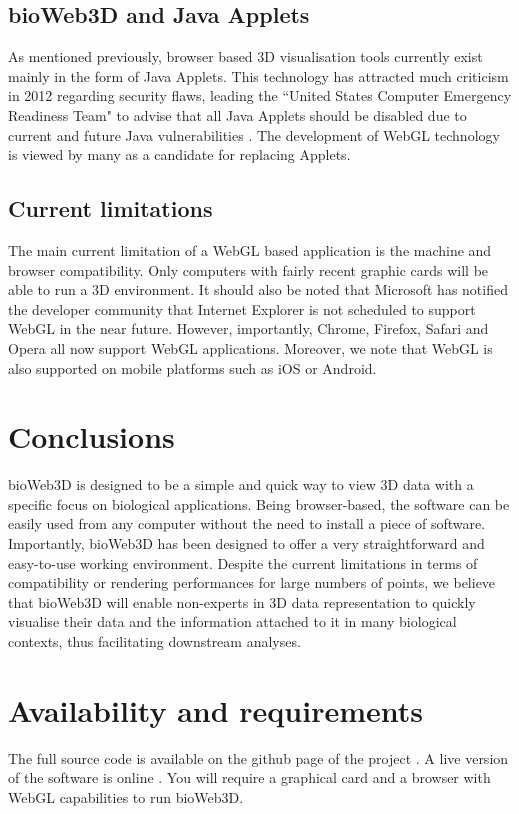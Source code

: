 \documentclass[10pt]{bmc_article}
\newenvironment{bmcformat}{\baselineskip20pt\sloppy\setboolean{publ}{false}}{\baselineskip20pt\sloppy}
\begin{document}
\begin{bmcformat}
	\subsection{bioWeb3D and Java Applets}
As mentioned previously, browser based 3D visualisation tools currently exist mainly in the form of Java Applets. This technology has attracted much criticism in 2012 regarding security flaws, leading the ``United States Computer Emergency Readiness Team" to advise that all Java Applets should be disabled due to current and future Java vulnerabilities \cite{security}. The development of WebGL technology is viewed by many as a candidate for replacing Applets. 



	\subsection{Current limitations}
The main current limitation of a WebGL based application is the machine and browser compatibility. Only computers with fairly recent graphic cards will be able to run a 3D environment. It should also be noted that Microsoft has notified the developer community that Internet Explorer is not scheduled to support WebGL in the near future. However, importantly, Chrome, Firefox, Safari and Opera all now support WebGL applications. Moreover, we note that WebGL is also supported on mobile platforms such as iOS or Android. \cite{caniuse}

\section{Conclusions}
bioWeb3D is designed to be a simple and quick way to view 3D data with a specific focus on biological applications.  Being browser-based, the software can be easily used from any computer without the need to install a piece of software. Importantly, bioWeb3D has been designed to offer a very straightforward and easy-to-use working environment. Despite the current limitations in terms of compatibility or rendering performances for large numbers of points, we believe that bioWeb3D will enable non-experts in 3D data representation to quickly visualise their data and the information attached to it in many biological contexts, thus facilitating downstream analyses.

\section{Availability and requirements}
The full source code is available on the github page of the project \cite{github}. A live version of the software is online \cite{bioWeb3D}. You will require a graphical card and a browser with WebGL capabilities to run bioWeb3D.





\end{bmcformat}
\end{document}
